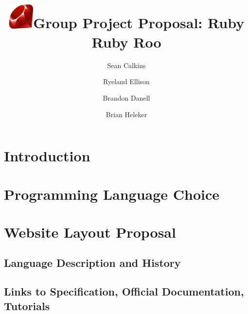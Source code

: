 \documentclass{article}
\begin{document}
\title{\includegraphics[width=0.1\textwidth]{./ruby.png}Group Project Proposal: Ruby Ruby Roo}



\author{
  Sean Calkins \\
  \texttt{}
  \and
  Ryeland Ellison \\
  \texttt{}
  \and
  Brandon Danell \\
  \texttt{}
  \and
  Brian Heleker\\
  \texttt{}
}



\maketitle

\section{Introduction}

\section{Programming Language Choice}

\section{Website Layout Proposal}

\subsection{Language Description and History}

\subsection{Links to Specification, Official Documentation, Tutorials}
\end{document}
